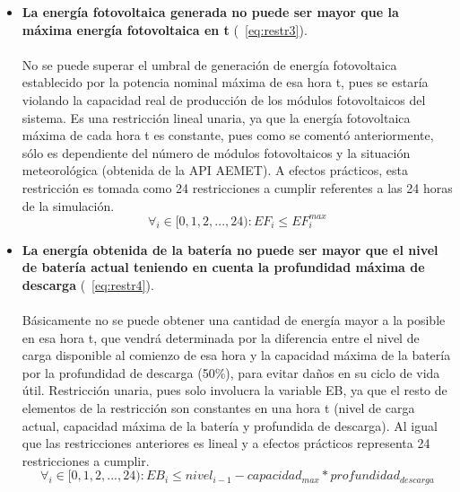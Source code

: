 \begin{itemize}
\item \textbf{La energía fotovoltaica generada no puede ser mayor que la máxima energía fotovoltaica en t} (~\ref{eq:restr3}).\\ \\No se puede superar el umbral de generación de energía fotovoltaica establecido por la potencia nominal máxima de esa hora t, pues se estaría violando la capacidad real de producción de los módulos fotovoltaicos del sistema. Es una restricción lineal unaria, ya que la energía fotovoltaica máxima de cada hora t es constante, pues como se comentó anteriormente, sólo es dependiente del número de módulos fotovoltaicos y la situación meteorológica (obtenida de la API AEMET). A efectos prácticos, esta restricción es tomada como 24 restricciones a cumplir referentes a las 24 horas de la simulación.
\begin{equation}
        \label{eq:restr3}
        \forall_{i} \in [0, 1, 2, ..., 24) : EF_{i} \leq EF_{i}^{max}
\end{equation}

\item \textbf{La energía obtenida de la batería no puede ser mayor que el nivel de batería actual teniendo en cuenta la profundidad máxima de descarga} (~\ref{eq:restr4}).\\ \\Básicamente no se puede obtener una cantidad de energía mayor a la posible en esa hora t, que vendrá determinada por la diferencia entre el  nivel de carga disponible al comienzo de esa hora y la capacidad máxima de la batería por la profundidad de descarga (50\%), para evitar daños en su ciclo de vida útil. Restricción unaria, pues solo involucra la variable EB, ya que el resto de elementos de la restricción son constantes en una hora t (nivel de carga actual, capacidad máxima de la batería y profundida de descarga). Al igual que las restricciones anteriores es lineal y a efectos prácticos representa 24 restricciones a cumplir.
\begin{equation}
        \label{eq:restr4}
        \forall_{i} \in [0, 1, 2, ..., 24) : EB_{i} \leq nivel_{i-1} - capacidad_{max} * profundidad_{descarga}
\end{equation}


\end{itemize}
